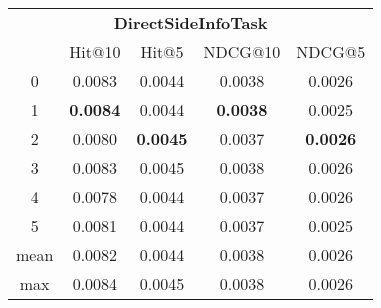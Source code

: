 \documentclass{article}
\begin{document}
 

\begin{tabular}{c|cccc}

\multicolumn{5}{c}{\textbf{DirectSideInfoTask}} \\
\noalign{\smallskip}
\noalign{\smallskip}
\toprule
\multicolumn{1}{c}{Template ID}	&	\multicolumn{1}{|c}{Hit@10}	&	\multicolumn{1}{c}{Hit@5}	&	\multicolumn{1}{c}{NDCG@10}	&	\multicolumn{1}{c}{NDCG@5}\\
\midrule
0	&	0.0083	&	0.0044	&	0.0038	&	0.0026\\
1	&	\textbf{0.0084}	&	0.0044	&	\textbf{0.0038}	&	0.0025\\
2	&	0.0080	&	\textbf{0.0045}	&	0.0037	&	\textbf{0.0026}\\
3	&	0.0083	&	0.0045	&	0.0038	&	0.0026\\
4	&	0.0078	&	0.0044	&	0.0037	&	0.0026\\
5	&	0.0081	&	0.0044	&	0.0037	&	0.0025\\
\midrule
mean	&	0.0082	&	0.0044	&	0.0038	&	0.0026\\
max	&	0.0084	&	0.0045	&	0.0038	&	0.0026\\
\bottomrule

\end{tabular}
\end{document}
